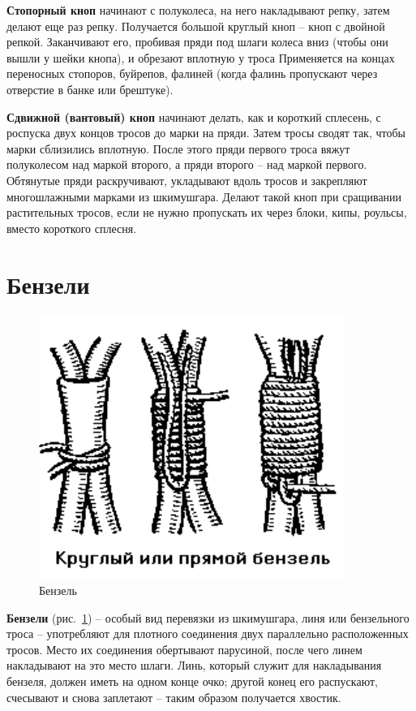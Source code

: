 \documentclass[a4paper, 12pt, twoside, final]{scrbook}
\begin{document}
\textbf{Стопорный кноп} начинают с полуколеса, на него накладывают репку, затем делают еще раз репку. Получается большой круглый кноп \--- кноп с двойной репкой. Заканчивают его, пробивая пряди под шлаги колеса вниз (чтобы они вышли у шейки кнопа), и обрезают вплотную у троса Применяется на концах переносных стопоров, буйрепов, фалиней (когда фалинь пропускают через отверстие в банке или брештуке).

\textbf{Сдвижной (вантовый) кноп} начинают делать, как и короткий сплесень, с роспуска двух концов тросов до марки на пряди. Затем тросы сводят так, чтобы марки сблизились вплотную. После этого пряди первого троса вяжут полуколесом над маркой второго, а пряди второго \--- над маркой первого. Обтянутые пряди раскручивают, укладывают вдоль тросов и закрепляют многошлажными марками из шкимушгара. Делают такой кноп при сращивании растительных тросов, если не нужно пропускать их через блоки, кипы, роульсы, вместо короткого сплесня.

\section{Бензели}

\begin{figure}
   \centering
   \includegraphics{70_Benzel} %
   \caption{Бензель}
   \label{fig:70}
\end{figure}

\textbf{Бензели} (рис.~\ref{fig:70}) \--- особый вид перевязки из шкимушгара, линя или бензельного троса \--- употребляют для плотного соединения двух параллельно расположенных тросов. Место их соединения обертывают парусиной, после чего линем накладывают на это место шлаги. Линь, который служит для накладывания бензеля, должен иметь на одном конце очко; другой конец его распускают, счесывают и снова заплетают \--- таким образом получается хвостик.
\end{document}
